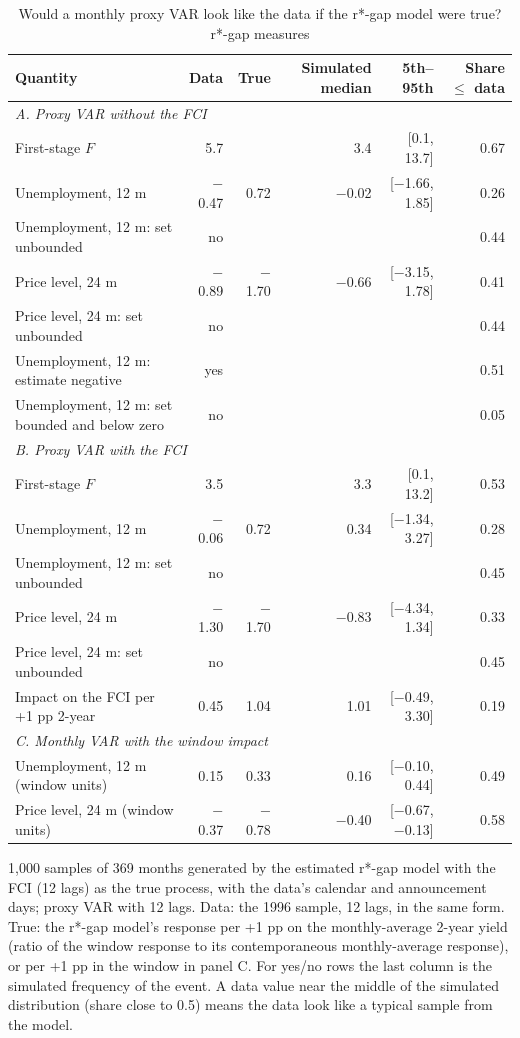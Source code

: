 \begin{table}[H]\centering\footnotesize\setlength{\tabcolsep}{3pt}
\caption{Would a monthly proxy VAR look like the data if the r*-gap model were true? r*-gap measures}\label{tab:proxysimrstar}
\begin{tabular}{lrrrrr}\toprule Quantity & Data & True & Simulated median & 5th--95th & Share $\le$ data\\ \midrule
\multicolumn{6}{l}{\textit{A. Proxy VAR without the FCI}}\\
\quad First-stage $F$ & 5.7 &  & 3.4 & [0.1, 13.7] & 0.67\\
\quad Unemployment, 12 m & $-$0.47 & 0.72 & $-$0.02 & [$-$1.66, 1.85] & 0.26\\
\quad Unemployment, 12 m: set unbounded & no &  &  &  & 0.44\\
\quad Price level, 24 m & $-$0.89 & $-$1.70 & $-$0.66 & [$-$3.15, 1.78] & 0.41\\
\quad Price level, 24 m: set unbounded & no &  &  &  & 0.44\\
\quad Unemployment, 12 m: estimate negative & yes &  &  &  & 0.51\\
\quad Unemployment, 12 m: set bounded and below zero & no &  &  &  & 0.05\\
\multicolumn{6}{l}{\textit{B. Proxy VAR with the FCI}}\\
\quad First-stage $F$ & 3.5 &  & 3.3 & [0.1, 13.2] & 0.53\\
\quad Unemployment, 12 m & $-$0.06 & 0.72 & 0.34 & [$-$1.34, 3.27] & 0.28\\
\quad Unemployment, 12 m: set unbounded & no &  &  &  & 0.45\\
\quad Price level, 24 m & $-$1.30 & $-$1.70 & $-$0.83 & [$-$4.34, 1.34] & 0.33\\
\quad Price level, 24 m: set unbounded & no &  &  &  & 0.45\\
\quad Impact on the FCI per +1 pp 2-year & 0.45 & 1.04 & 1.01 & [$-$0.49, 3.30] & 0.19\\
\multicolumn{6}{l}{\textit{C. Monthly VAR with the window impact}}\\
\quad Unemployment, 12 m (window units) & 0.15 & 0.33 & 0.16 & [$-$0.10, 0.44] & 0.49\\
\quad Price level, 24 m (window units) & $-$0.37 & $-$0.78 & $-$0.40 & [$-$0.67, $-$0.13] & 0.58\\
\bottomrule\end{tabular}
\par\smallskip\parbox{0.95\linewidth}{\scriptsize 1,000 samples of 369 months generated by the estimated r*-gap model with the FCI (12 lags) as the true process, with the data's calendar and announcement days; proxy VAR with 12 lags. Data: the 1996 sample, 12 lags, in the same form. True: the r*-gap model's response per +1 pp on the monthly-average 2-year yield (ratio of the window response to its contemporaneous monthly-average response), or per +1 pp in the window in panel C. For yes/no rows the last column is the simulated frequency of the event. A data value near the middle of the simulated distribution (share close to 0.5) means the data look like a typical sample from the model.}
\end{table}
